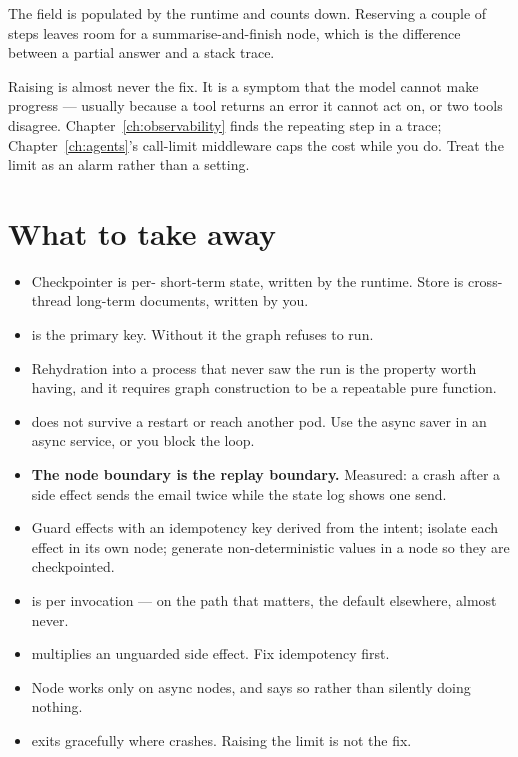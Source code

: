The field is populated by the runtime and counts down. Reserving a couple of
steps leaves room for a summarise-and-finish node, which is the difference
between a partial answer and a stack trace.

\begin{warning}
Raising  is almost never the fix. It is a symptom that the
model cannot make progress --- usually because a tool returns an error it cannot
act on, or two tools disagree. Chapter~\ref{ch:observability} finds the repeating
step in a trace; Chapter~\ref{ch:agents}'s call-limit middleware caps the cost
while you do. Treat the limit as an alarm rather than a setting.
\end{warning}

\section{What to take away}
\label{sec:ch9-summary}

\begin{itemize}[leftmargin=1.4em]
\item Checkpointer is per- short-term state, written by the
      runtime. Store is cross-thread long-term documents, written by you.
\item {} is the primary key. Without it the graph refuses to run.
\item Rehydration into a process that never saw the run is the property worth
      having, and it requires graph construction to be a repeatable pure
      function.
\item {} does not survive a restart or reach another pod. Use
      the async saver in an async service, or you block the loop.
\item \textbf{The node boundary is the replay boundary.} Measured: a crash after
      a side effect sends the email twice while the state log shows one send.
\item Guard effects with an idempotency key derived from the intent; isolate each
      effect in its own node; generate non-deterministic values in a node so they
      are checkpointed.
\item {} is per invocation ---  on the path that
      matters, the default elsewhere,  almost never.
\item {} multiplies an unguarded side effect. Fix idempotency
      first.
\item Node  works only on async nodes, and says so rather than
      silently doing nothing.
\item {} exits gracefully where 
      crashes. Raising the limit is not the fix.
\end{itemize}

